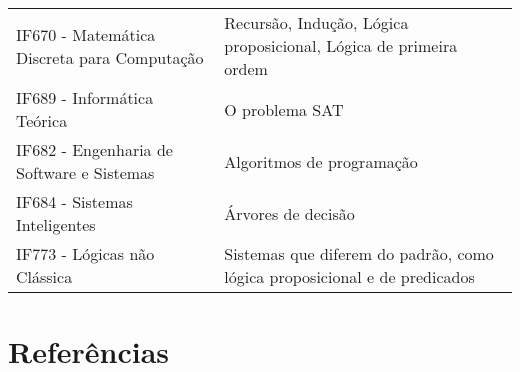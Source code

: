 \documentclass{article}
\begin{document}
\begin{table}[h]
 \centering

 {\renewcommand\arraystretch{1.25}
 \begin{tabular}{ l l }
  \cline{1-1}\cline{2-2}  
    \multicolumn{1}{|p{4.083cm}|}{IF670 - Matemática Discreta para Computação \centering } &
    \multicolumn{1}{p{4.033cm}|}{Recursão, Indução, Lógica proposicional, Lógica de primeira ordem \centering }
  \\  
  \cline{1-1}\cline{2-2}  
    \multicolumn{1}{|p{4.083cm}|}{IF689 - Informática Teórica \centering } &
    \multicolumn{1}{p{4.033cm}|}{O problema SAT \centering }
  \\  
  \cline{1-1}\cline{2-2}  
    \multicolumn{1}{|p{4.083cm}|}{IF682 - Engenharia de Software e Sistemas \centering } &
    \multicolumn{1}{p{4.033cm}|}{Algoritmos de programação \centering }
  \\  
  \cline{1-1}\cline{2-2}  
    \multicolumn{1}{|p{4.083cm}|}{IF684 - Sistemas Inteligentes \centering } &
    \multicolumn{1}{p{4.033cm}|}{Árvores de decisão \centering }
  \\  
  \cline{1-1}\cline{2-2}  
    \multicolumn{1}{|p{4.083cm}|}{IF773 - Lógicas não Clássica \centering } &
    \multicolumn{1}{p{4.033cm}|}{Sistemas que diferem do padrão, como lógica proposicional e de predicados \centering }
  \\  
  \hline

 \end{tabular} }
\end{table}

\section{Referências}

 \cite{dirk2004vandalen}
 \cite{wilfrid1997}
 \cite{jon2000john}
 \cite{jean1986galier}
 \cite{girard1989lafont}

\end{document}
